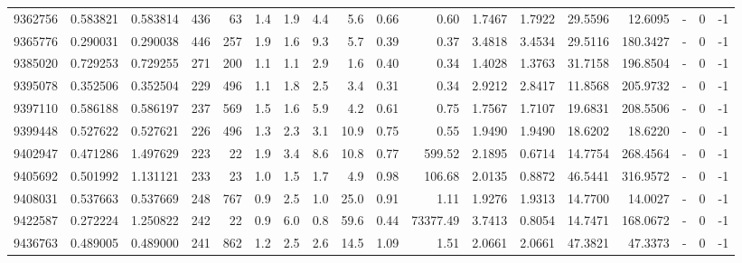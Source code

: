 \begin{tabular}{rrrrrrrrrrrrrrrlrr}
   9362756 & 0.583821 &   0.583814 &  436 &   63 &      1.4 &      1.9 &     4.4 &      5.6 &       0.66 &        0.60 &  1.7467 &  1.7922 &   29.5596 &   12.6095 &             - &        0 &         -1 \\
   9365776 & 0.290031 &   0.290038 &  446 &  257 &      1.9 &      1.6 &     9.3 &      5.7 &       0.39 &        0.37 &  3.4818 &  3.4534 &   29.5116 &  180.3427 &             - &        0 &         -1 \\
   9385020 & 0.729253 &   0.729255 &  271 &  200 &      1.1 &      1.1 &     2.9 &      1.6 &       0.40 &        0.34 &  1.4028 &  1.3763 &   31.7158 &  196.8504 &             - &        0 &         -1 \\
   9395078 & 0.352506 &   0.352504 &  229 &  496 &      1.1 &      1.8 &     2.5 &      3.4 &       0.31 &        0.34 &  2.9212 &  2.8417 &   11.8568 &  205.9732 &             - &        0 &         -1 \\
   9397110 & 0.586188 &   0.586197 &  237 &  569 &      1.5 &      1.6 &     5.9 &      4.2 &       0.61 &        0.75 &  1.7567 &  1.7107 &   19.6831 &  208.5506 &             - &        0 &         -1 \\
   9399448 & 0.527622 &   0.527621 &  226 &  496 &      1.3 &      2.3 &     3.1 &     10.9 &       0.75 &        0.55 &  1.9490 &  1.9490 &   18.6202 &   18.6220 &             - &        0 &         -1 \\
   9402947 & 0.471286 &   1.497629 &  223 &   22 &      1.9 &      3.4 &     8.6 &     10.8 &       0.77 &      599.52 &  2.1895 &  0.6714 &   14.7754 &  268.4564 &             - &        0 &         -1 \\
   9405692 & 0.501992 &   1.131121 &  233 &   23 &      1.0 &      1.5 &     1.7 &      4.9 &       0.98 &      106.68 &  2.0135 &  0.8872 &   46.5441 &  316.9572 &             - &        0 &         -1 \\
   9408031 & 0.537663 &   0.537669 &  248 &  767 &      0.9 &      2.5 &     1.0 &     25.0 &       0.91 &        1.11 &  1.9276 &  1.9313 &   14.7700 &   14.0027 &             - &        0 &         -1 \\
   9422587 & 0.272224 &   1.250822 &  242 &   22 &      0.9 &      6.0 &     0.8 &     59.6 &       0.44 &    73377.49 &  3.7413 &  0.8054 &   14.7471 &  168.0672 &             - &        0 &         -1 \\
   9436763 & 0.489005 &   0.489000 &  241 &  862 &      1.2 &      2.5 &     2.6 &     14.5 &       1.09 &        1.51 &  2.0661 &  2.0661 &   47.3821 &   47.3373 &             - &        0 &         -1 \\

\end{tabular}
